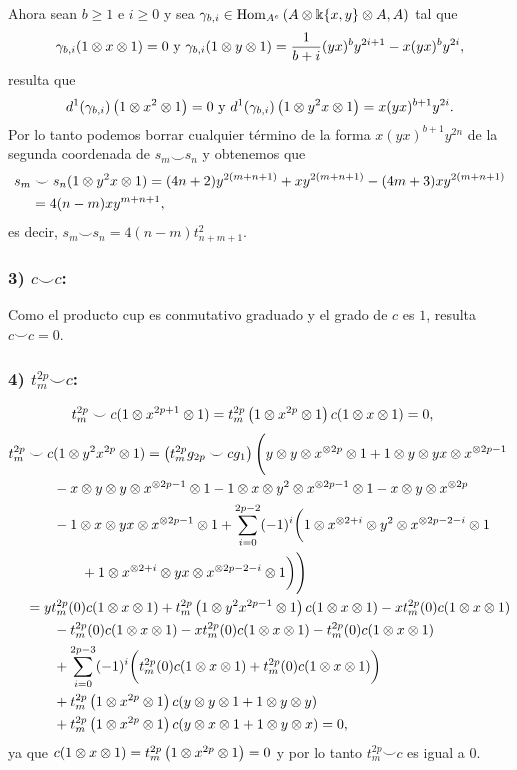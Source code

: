 \documentclass[fleqn,../tesis.tex]{subfiles}
\begin{document}
Ahora sean $b \geq  1$ e $i \geq 0$ y sea $\gamma_{b, i} \in \operatorname{Hom}_{A^e}\left(A\otimes \Bbbk\{x, y\}\otimes A, A\right)$ tal que
\[
	\gamma_{b, i}(1\otimes x \otimes 1) = 0 \text{ y }
		\gamma_{b, i}(1 \otimes y \otimes 1) = \frac{1}{b + i}(yx)^{b}y^{2i + 1} - x(yx)^{b}y^{2i},
\]
resulta que
\[
	d^1(\gamma_{b, i})\left(1\otimes x^2 \otimes 1\right) = 0
		\text{ y } d^1(\gamma_{b, i})\left(1\otimes y^2x \otimes 1\right) = x(yx)^{b + 1}y^{2i}.
\]
Por lo tanto podemos borrar cualquier término de la forma $x(yx)^{b + 1}y^{2n}$ de la segunda coordenada
de $s_m \smile s_n$ y obtenemos que
\begin{align*}
	s_m &\smile s_n(1 \otimes y^2x\otimes 1) = (4n + 2)y^{2(m + n + 1)} + xy^{2( m + n + 1)} - (4m + 3)xy^{2(m + n + 1)}\\
	&= 4(n - m)xy^{m + n + 1},
\end{align*}
es decir, $s_m \smile s_n = 4(n - m)t_{n + m + 1}^{2}$.
\subsubsection{3) $c \smile c$:}
Como el producto cup es conmutativo graduado y el grado de $c$ es $1$, resulta $c \smile c = 0$.

\subsubsection{4) $t_m^{2p} \smile c$:}
\begin{align*}
	t_m^{2p}&\smile c(1 \otimes x^{2p + 1} \otimes 1) = t_m^{2p}\left(1\otimes x^{2p} \otimes 1\right)c(1 \otimes x \otimes 1) = 0,
\end{align*}	
\begin{align*}
	t_m^{2p}&\smile c(1 \otimes y^2x^{2p} \otimes 1) = \left(t_m^{2p}g_{2p}\smile cg_1\right)
		\Bigg(y\otimes y \otimes x^{\otimes 2p} \otimes 1  + 1 \otimes y \otimes yx \otimes x^{ \otimes 2p - 1} \\
	&\qquad - x \otimes y \otimes y \otimes x^{\otimes 2p - 1} \otimes 1 - 1\otimes x \otimes y^{2} \otimes x^{\otimes 2p - 1}\otimes 1
		- x \otimes y \otimes x^{\otimes 2p}\\
	&\qquad -1 \otimes x \otimes yx \otimes x^{\otimes 2p - 1} \otimes 1
		+ \sum_{i = 0}^{2p - 2}(-1)^{i}\bigg(1\otimes x^{\otimes 2 + i} \otimes y^2 \otimes x^{\otimes 2p - 2 - i} \otimes 1\\
	&\qquad\qquad + 1 \otimes x^{\otimes 2 + i} \otimes yx \otimes x^{\otimes 2p - 2 - i} \otimes 1\bigg) \Bigg)\\
	&= yt_m^{2p}(0)c(1 \otimes x \otimes 1) + t_m^{2p}\left(1 \otimes y^2x^{2p - 1} \otimes 1\right) c(1 \otimes x \otimes 1)
		- x t_m^{2p}(0)c(1 \otimes x \otimes 1)\\	
	&\qquad - t_m^{2p}(0)c(1 \otimes x \otimes 1) -xt_m^{2p}(0)c(1 \otimes x \otimes 1) -t_m^{2p}(0)c(1 \otimes x \otimes 1)\\
	&\qquad + \sum_{i = 0}^{2p - 3}(-1)^{i}\bigg(t_m^{2p}(0)c(1 \otimes x \otimes 1) + t_m^{2p}(0)c(1 \otimes x \otimes 1)\bigg)\\
	&\qquad + t_m^{2p}\left(1 \otimes x^{2p} \otimes 1\right)c(y \otimes y \otimes 1 + 1 \otimes y \otimes y)\\
	&\qquad + t_m^{2p}\left(1 \otimes x^{2p} \otimes 1\right)c(y \otimes x \otimes 1 + 1 \otimes y \otimes x) = 0,
	\end{align*}	
ya que $c(1\otimes x \otimes 1) = t_m^{2p}\left(1 \otimes x^{2p} \otimes 1\right) = 0$ y por lo tanto
$t_m^{2p}\smile c$ es igual a $0$.
\end{document}
